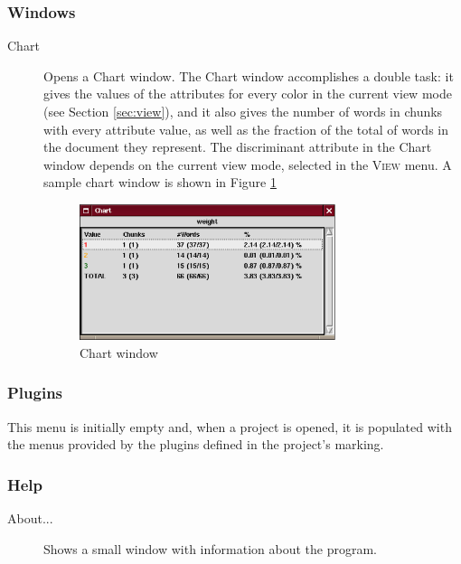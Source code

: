 \documentclass{article}
\begin{document}
\subsubsection{Windows}
\label{sec:windows}
\begin{description}
\item[Chart] Opens a Chart window. The Chart window accomplishes a
double task: it gives the values of the attributes for every color in
the current view mode (see Section \ref{sec:view}), and it also gives
the number of words in chunks with every attribute value, as well as
the fraction of the total of words in the document they represent. The
discriminant attribute in the Chart window depends on the current view
mode, selected in the \textsc{View} menu. A sample chart window is
shown in Figure \ref{fig:chartwin}

\begin{figure}[ht]
\begin{center}

\includegraphics[width=75mm]{img/chart.eps}

\caption{Chart window}
\label{fig:chartwin}
\end{center}
\end{figure}

\end{description}

\subsubsection{Plugins}
\label{sec:pluginmenu}
This menu is initially empty and, when a project is opened, it is
populated with the menus provided by the plugins defined in the
project's marking.

\subsubsection{Help}
\begin{description}
\item[About...] Shows a small window with information about the
program.
\end{description}
\end{document}
